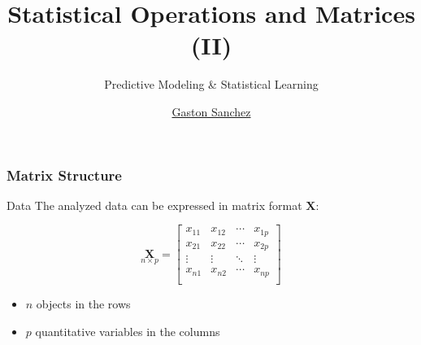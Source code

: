 \documentclass[12pt]{beamer}\usepackage[]{graphicx}\usepackage[]{color}
\title{Statistical Operations and Matrices (II)}
\subtitle{Predictive Modeling \& Statistical Learning}
\author{\href{http://www.gastonsanchez.com}{Gaston Sanchez}}
\institute{\href{https://creativecommons.org/licenses/by-sa/4.0/}{\tt \scriptsize \color{foreground} CC BY-SA 4.0}}
\date{}
\begin{document}
{
  \frame{\titlepage} 
}


\begin{frame}
\begin{center}
\Huge{}
\end{center}
\end{frame}


\begin{frame}
\frametitle{Matrix Structure}

\begin{block}{Data}
The analyzed data can be expressed in matrix format $\mathbf{X}$:

\[ \underset{n \times p}{\mathbf{X}} = 
\left[\begin{array}{cccc}
x_{11} & x_{12} & \cdots & x_{1p} \\
x_{21} & x_{22} & \cdots & x_{2p} \\
\vdots & \vdots & \ddots & \vdots \\
x_{n1} & x_{n2} & \cdots & x_{np} \\
\end{array}\right]
\]
\end{block}

\begin{itemize}
 \item $n$ objects in the rows
 \item $p$ quantitative variables in the columns
\end{itemize}

\end{frame}


\begin{frame}
\begin{center}
\Huge{}
\end{center}
\end{frame}

\end{document}
